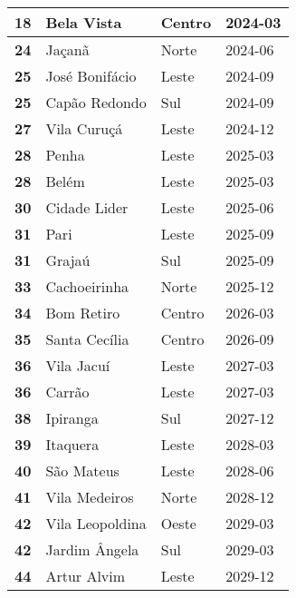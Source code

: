 \begin{table}[H]
\begin{tabular}{l|l|l|l}
		\textbf{18} & Bela Vista & Centro & 2024-03\\ \hline
		\textbf{24} & Jaçanã & Norte & 2024-06\\ \hline
		\textbf{25} & José Bonifácio & Leste & 2024-09\\ \hline
		\textbf{25} & Capão Redondo & Sul & 2024-09\\ \hline
		\textbf{27} & Vila Curuçá & Leste & 2024-12\\ \hline
		\textbf{28} & Penha & Leste & 2025-03\\ \hline
		\textbf{28} & Belém & Leste & 2025-03\\ \hline
		\textbf{30} & Cidade Lider & Leste & 2025-06\\ \hline
		\textbf{31} & Pari & Leste & 2025-09\\ \hline
		\textbf{31} & Grajaú & Sul & 2025-09\\ \hline
		\textbf{33} & Cachoeirinha & Norte & 2025-12\\ \hline
		\textbf{34} & Bom Retiro & Centro & 2026-03\\ \hline
		\textbf{35} & Santa Cecília & Centro & 2026-09\\ \hline
		\textbf{36} & Vila Jacuí & Leste & 2027-03\\ \hline
		\textbf{36} & Carrão & Leste & 2027-03\\ \hline
		\textbf{38} & Ipiranga & Sul & 2027-12\\ \hline
		\textbf{39} & Itaquera & Leste & 2028-03\\ \hline
		\textbf{40} & São Mateus & Leste & 2028-06\\ \hline
		\textbf{41} & Vila Medeiros & Norte & 2028-12\\ \hline
		\textbf{42} & Vila Leopoldina & Oeste & 2029-03\\ \hline
		\textbf{42} & Jardim Ângela & Sul & 2029-03\\ \hline
		\textbf{44} & Artur Alvim & Leste & 2029-12\\ 	
	\end{tabular}
\end{table}

